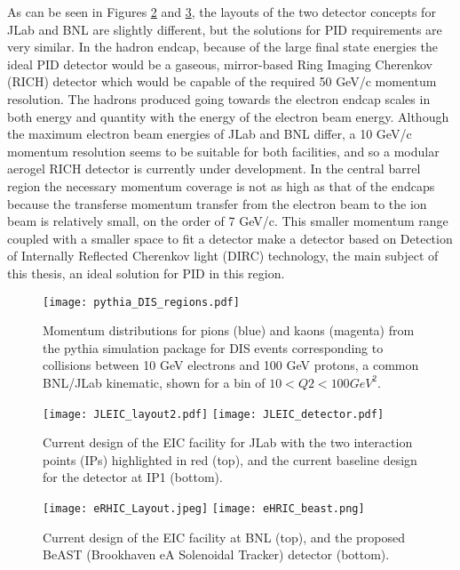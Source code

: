 As can be seen in Figures \ref{fig:jleic_layout} and \ref{fig:erhic_layout}, the layouts of the two detector concepts for JLab and BNL are slightly different, but the solutions for PID requirements are very similar. In the hadron endcap, because of the large final state energies the ideal PID detector would be a gaseous, mirror-based Ring Imaging Cherenkov (RICH) detector which would be capable of the required 50 GeV/c momentum resolution. The hadrons produced going towards the electron endcap scales in both energy and quantity with the energy of the electron beam energy. Although the maximum electron beam energies of JLab and BNL differ, a 10 GeV/c momentum resolution seems to be suitable for both facilities, and so a modular aerogel RICH detector is currently under development. In the central barrel region the necessary momentum coverage is not as high as that of the endcaps because the transferse momentum transfer from the electron beam to the ion beam is relatively small, on the order of 7 GeV/c. This smaller momentum range coupled with a smaller space to fit a detector make a detector based on Detection of Internally Reflected Cherenkov light (DIRC) technology, the main subject of this thesis, an ideal solution for PID in this region.


\begin{figure}[ht]
	\centering
	\texttt{[image: pythia\_DIS\_regions.pdf]}
	\caption{Momentum distributions for pions (blue) and kaons (magenta) from the pythia simulation package for DIS events corresponding to collisions between 10 GeV electrons and 100 GeV protons, a common BNL/JLab kinematic, shown for a bin of $10<Q2<100\unit{GeV}^2$.}
	\label{fig:pythia_DIS}
\end{figure}


\begin{figure}[ht]
	\centering
	\texttt{[image: JLEIC\_layout2.pdf]}
	\texttt{[image: JLEIC\_detector.pdf]}
	\caption{Current design of the EIC facility for JLab with the two interaction points (IPs) highlighted in red (top), and the current baseline design for the detector at IP1 (bottom).}
	\label{fig:jleic_layout}
\end{figure}

\begin{figure}[ht]
	\centering
	\texttt{[image: eRHIC\_Layout.jpeg]}
	\texttt{[image: eHRIC\_beast.png]}
	\caption{Current design of the EIC facility at BNL (top), and the proposed BeAST (Brookhaven eA Solenoidal Tracker) detector (bottom).}
	\label{fig:erhic_layout}
\end{figure}